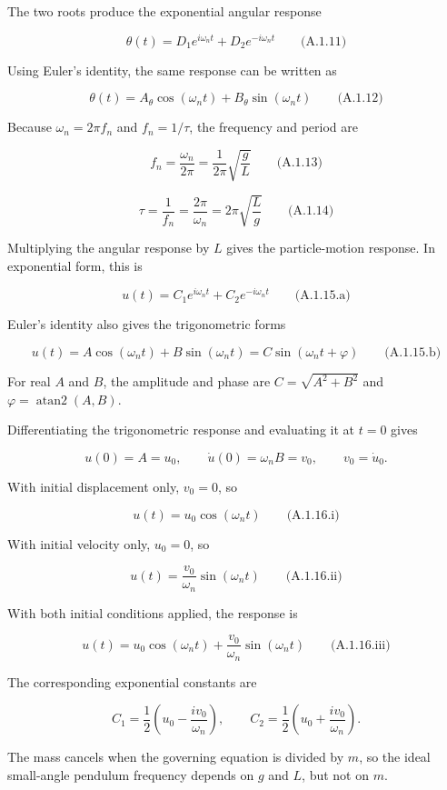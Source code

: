 The two roots produce the exponential angular response

\[\boxed{\theta(t)=D_1e^{i\omega_nt}+D_2e^{-i\omega_nt}}\qquad\text{(A.1.11)}\]

Using Euler's identity, the same response can be written as

\[\boxed{\theta(t)=A_\theta\cos(\omega_nt)+B_\theta\sin(\omega_nt)}\qquad\text{(A.1.12)}\]

Because \(\omega_n=2\pi f_n\) and \(f_n=1/\tau\), the frequency and period are

\[\boxed{f_n=\frac{\omega_n}{2\pi}=\frac{1}{2\pi}\sqrt{\frac{g}{L}}}\qquad\text{(A.1.13)}\]

\[\boxed{\tau=\frac{1}{f_n}=\frac{2\pi}{\omega_n}=2\pi\sqrt{\frac{L}{g}}}\qquad\text{(A.1.14)}\]

Multiplying the angular response by \(L\) gives the particle-motion response. In exponential form, this is

\[\boxed{u(t)=C_1e^{i\omega_nt}+C_2e^{-i\omega_nt}}\qquad\text{(A.1.15.a)}\]

Euler's identity also gives the trigonometric forms

\[\boxed{u(t)=A\cos(\omega_nt)+B\sin(\omega_nt)
=C\sin(\omega_nt+\varphi)}\qquad\text{(A.1.15.b)}\]

For real \(A\) and \(B\), the amplitude and phase are \(C=\sqrt{A^2+B^2}\) and \(\varphi=\operatorname{atan2}(A,B)\).

Differentiating the trigonometric response and evaluating it at \(t=0\) gives

\[u(0)=A=u_0,\qquad \dot u(0)=\omega_nB=v_0,\qquad v_0=\dot u_0.\]

With initial displacement only, \(v_0=0\), so

\[\boxed{u(t)=u_0\cos(\omega_nt)}\qquad\text{(A.1.16.i)}\]

With initial velocity only, \(u_0=0\), so

\[\boxed{u(t)=\frac{v_0}{\omega_n}\sin(\omega_nt)}\qquad\text{(A.1.16.ii)}\]

With both initial conditions applied, the response is

\[\boxed{u(t)=u_0\cos(\omega_nt)+\frac{v_0}{\omega_n}\sin(\omega_nt)}\qquad\text{(A.1.16.iii)}\]

The corresponding exponential constants are

\[C_1=\frac12\left(u_0-\frac{iv_0}{\omega_n}\right),\qquad
C_2=\frac12\left(u_0+\frac{iv_0}{\omega_n}\right).\]

The mass cancels when the governing equation is divided by \(m\), so the ideal small-angle pendulum frequency depends on \(g\) and \(L\), but not on \(m\).
